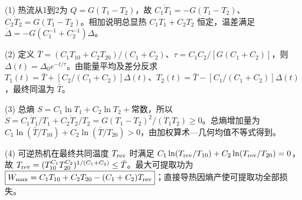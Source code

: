 (1) 热流从1到2为 \(Q=G(T_1-T_2)\)，故 \(C_1\dot T_1=-G(T_1-T_2)\)、\(C_2\dot T_2=G(T_1-T_2)\)。相加说明总显热 \(C_1T_1+C_2T_2\) 恒定，温差满足 \(\dot\Delta=-G(C_1^{-1}+C_2^{-1})\Delta\)。

(2) 定义 \(\bar T=(C_1T_{10}+C_2T_{20})/(C_1+C_2)\)、\(\tau=C_1C_2/[G(C_1+C_2)]\)，则 \(\Delta(t)=\Delta_0e^{-t/\tau}\)。由能量平均及差分反求 \(T_1(t)=\bar T+[C_2/(C_1+C_2)]\Delta(t)\)、\(T_2(t)=\bar T-[C_1/(C_1+C_2)]\Delta(t)\)，最终同温为 \(\bar T\)。

(3) 总熵 \(S=C_1\ln T_1+C_2\ln T_2+\text{常数}\)，所以 \(\dot S=C_1\dot T_1/T_1+C_2\dot T_2/T_2=G(T_1-T_2)^2/(T_1T_2)\ge0\)。总熵增加量为 \(C_1\ln(\bar T/T_{10})+C_2\ln(\bar T/T_{20})>0\)，由加权算术—几何均值不等式得到。

(4) 可逆热机在最终共同温度 \(T_{\rm rev}\) 时满足 \(C_1\ln(T_{\rm rev}/T_{10})+C_2\ln(T_{\rm rev}/T_{20})=0\)，故 \(T_{\rm rev}=(T_{10}^{C_1}T_{20}^{C_2})^{1/(C_1+C_2)}\le\bar T\)。最大可提取功为 \(\boxed{W_{\max}=C_1T_{10}+C_2T_{20}-(C_1+C_2)T_{\rm rev}}\)；直接导热因熵产使可提取功全部损失。

